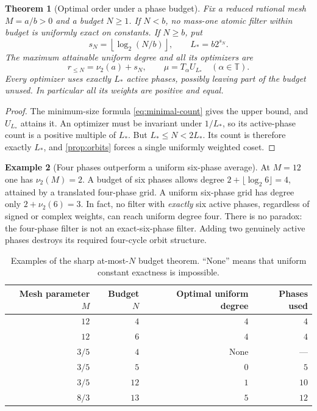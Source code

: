 \documentclass[11pt,a4paper]{article}
\numberwithin{equation}{section}
\theoremstyle{plain}
\newtheorem{theorem}{Theorem}[section]
\theoremstyle{definition}
\newtheorem{example}[theorem]{Example}
\theoremstyle{remark}
\newcommand{\T}{\mathbb T}
\begin{document}
\begin{theorem}[Optimal order under a phase budget]\label{thm:budget}
Fix a reduced rational mesh $M=a/b>0$ and a budget $N\ge1$.
If $N<b$, no mass-one atomic filter within budget is uniformly exact on
constants. If $N\ge b$, put
\begin{equation}\label{eq:budget-s}
 s_N=\left\lfloor\log_2(N/b)\right\rfloor,\qquad L_*=b2^{s_N}.
\end{equation}
The maximum attainable uniform degree and all its optimizers are
\begin{equation}\label{eq:budget-degree}
 r_{\le N}=\nu_2(a)+s_N,
 \qquad \mu=T_\alpha U_{L_*}\quad(\alpha\in\T).
\end{equation}
Every optimizer uses exactly $L_*$ active phases, possibly leaving part
of the budget unused. In particular all its weights are positive and
equal.
\end{theorem}
\begin{proof}
The minimum-size formula \eqref{eq:minimal-count} gives the upper bound,
and $U_{L_*}$ attains it. An optimizer must be invariant under $1/L_*$,
so its active-phase count is a positive multiple of $L_*$. But
$L_*\le N<2L_*$. Its count is therefore exactly $L_*$, and
\cref{prop:orbits} forces a single uniformly weighted coset.
\end{proof}

\begin{example}[Four phases outperform a uniform six-phase average]
At $M=12$ one has $\nu_2(M)=2$. A budget of six phases allows degree
$2+\lfloor\log_2 6\rfloor=4$, attained by a translated four-phase grid.
A uniform six-phase grid has degree only
$2+\nu_2(6)=3$. In fact, no filter with \emph{exactly} six active phases,
regardless of signed or complex weights, can reach uniform degree four.
There is no paradox: the four-phase filter is not an exact-six-phase
filter. Adding two genuinely active phases destroys its required
four-cycle orbit structure.
\end{example}

\begin{table}[htbp]
\centering
\caption{Examples of the sharp at-most-$N$ budget theorem. ``None'' means
that uniform constant exactness is impossible.}
\label{tab:budget}
\begin{tabular}{@{}rrrr@{}}
\toprule
Mesh parameter $M$ & Budget $N$ & Optimal uniform degree & Phases used\\
\midrule
$12$ & $4$ & $4$ & $4$\\
$12$ & $6$ & $4$ & $4$\\
$3/5$ & $4$ & None & ---\\
$3/5$ & $5$ & $0$ & $5$\\
$3/5$ & $12$ & $1$ & $10$\\
$8/3$ & $13$ & $5$ & $12$\\
\bottomrule
\end{tabular}
\end{table}
\end{document}
